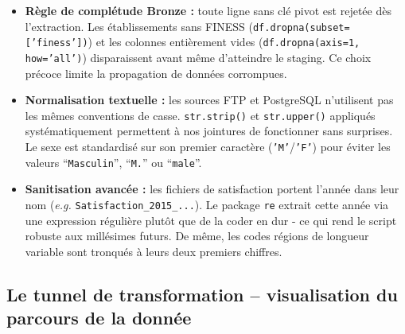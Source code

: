\documentclass[12pt,a4paper]{report}
\begin{document}
\begin{itemize}
    \item \textbf{Règle de complétude Bronze :} toute ligne sans clé pivot est rejetée dès l'extraction. Les établissements sans FINESS (\texttt{df.dropna(subset=['finess'])}) et les colonnes entièrement vides (\texttt{df.dropna(axis=1, how='all')}) disparaissent avant même d'atteindre le staging. Ce choix précoce limite la propagation de données corrompues.
    \item \textbf{Normalisation textuelle :} les sources FTP et PostgreSQL n'utilisent pas les mêmes conventions de casse. \texttt{str.strip()} et \texttt{str.upper()} appliqués systématiquement permettent à nos jointures de fonctionner sans surprises. Le sexe est standardisé sur son premier caractère (\texttt{'M'}/\texttt{'F'}) pour éviter les valeurs ``\texttt{Masculin}'', ``\texttt{M.}'' ou ``\texttt{male}''.
    \item \textbf{Sanitisation avancée :} les fichiers de satisfaction portent l'année dans leur nom (\textit{e.g.} \texttt{Satisfaction\_2015\_...}). Le package \texttt{re} extrait cette année via une expression régulière plutôt que de la coder en dur - ce qui rend le script robuste aux millésimes futurs. De même, les codes régions de longueur variable sont tronqués à leurs deux premiers chiffres.
\end{itemize}

\subsection{Le tunnel de transformation -- visualisation du parcours de la donnée}
\end{document}
